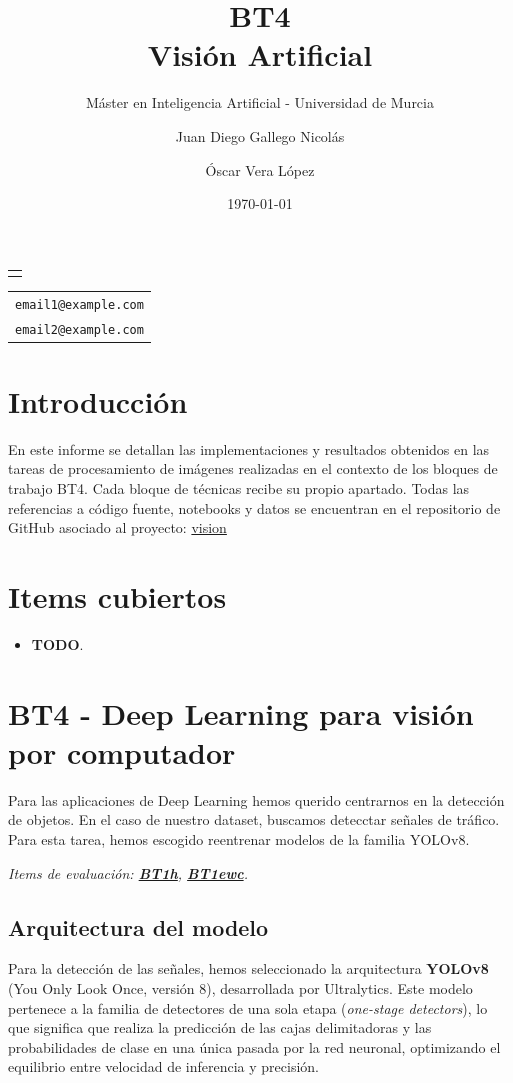 \documentclass[11pt,a4paper]{article}
\subtitle{Máster en Inteligencia Artificial - Universidad de Murcia}
\makeatletter
\providecommand\@subtitle{}
\providecommand\@emailone{email1@example.com}
\providecommand\@emailtwo{email2@example.com}
\renewcommand{\maketitle}{%
    \begin{titlepage}
        \centering
        \thispagestyle{empty}
        \vspace*{2.5cm}
        {\Huge\bfseries\@title\par}
        \vspace{1cm}
        {\Large\itshape\@subtitle\par}
        \vspace{3cm}
        {\large
            \begin{tabular}{c}
                \@author
            \end{tabular}\par
        }
        \vspace{0.6cm}
        {\small
            \begin{tabular}{c}
                \texttt{\@emailone} \\[0.8ex]
                \texttt{\@emailtwo}
            \end{tabular}\par
        }
        \vfill
        {\large \@date\par}
    \end{titlepage}%
}
\makeatother
\begin{document}
\title{BT4\\[1ex]\large Visión Artificial}
\author{Juan Diego Gallego Nicolás \and Óscar Vera López}
\date{\today}

\maketitle

\renewcommand{\contentsname}{Índice}
\setcounter{tocdepth}{3}
\tableofcontents
\clearpage

\section*{Introducción}
En este informe se detallan las implementaciones y resultados obtenidos en las tareas de procesamiento de imágenes realizadas en el contexto de los bloques de trabajo BT4.
Cada bloque de técnicas recibe su propio apartado. 
Todas las referencias a código fuente, notebooks y datos se encuentran en el repositorio de GitHub asociado al proyecto: \href{https://github.com/oscarveral/vision}{vision}

\section*{Items cubiertos}
\begin{itemize}
  \item \textbf{TODO}.
\end{itemize}


\clearpage
\section{BT4 - Deep Learning para visión por computador}

Para las aplicaciones de Deep Learning hemos querido centrarnos en la detección de objetos. En el caso de nuestro dataset,
buscamos detecctar señales de tráfico. Para esta tarea, hemos escogido reentrenar modelos de la familia YOLOv8.

\textit{Items de evaluación: \underline{\textbf{BT1h}},
\underline{\textbf{BT1ewc}}.}

\subsection{Arquitectura del modelo}

Para la detección de las señales, hemos seleccionado la arquitectura \textbf{YOLOv8} 
(You Only Look Once, versión 8), desarrollada por Ultralytics. 
Este modelo pertenece a la familia de detectores de una sola etapa (\textit{one-stage detectors}), 
lo que significa que realiza la predicción de las cajas delimitadoras y las probabilidades de clase en 
una única pasada por la red neuronal, optimizando el equilibrio entre velocidad de inferencia y precisión.
\end{document}
